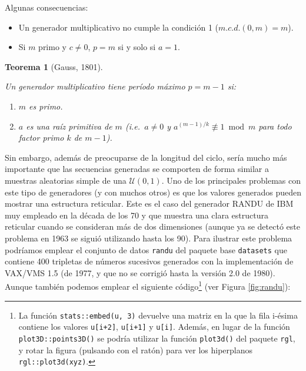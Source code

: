 \documentclass[
  10pt,
]{book}
\theoremstyle{break}
\newtheorem{theorem}{Teorema}[chapter]
\theoremstyle{nonumberplain}
\let\oldfootnote\footnote
\renewcommand\footnote[1]{\oldfootnote{\hspace{2mm}#1}}
\begin{document}
Algunas consecuencias:

\begin{itemize}
\item
  Un generador multiplicativo no cumple la condición 1 (\(m.c.d.(0, m) = m\)).
\item
  Si \(m\) primo y \(c \neq 0\), \(p = m\) si y solo si \(a = 1\).
\end{itemize}

\begin{theorem}[Gauss, 1801]
\protect\hypertarget{thm:gauss}{}\label{thm:gauss}

Un generador multiplicativo tiene período máximo \(p = m-1\) si:

\begin{enumerate}
\def\labelenumi{\arabic{enumi}.}
\item
  \(m\) es primo.
\item
  \(a\) es una raíz primitiva de \(m\) (i.e.~\(a \neq 0\) y \(a^{(m-1)/k} \not\equiv 1 \bmod m\)
  para todo factor primo \(k\) de \(m - 1\)).
\end{enumerate}

\end{theorem}

Sin embargo, además de preocuparse de la longitud del ciclo, sería mucho más importante que las secuencias generadas se comporten de forma similar a muestras aleatorias simple de una \(\mathcal{U}(0,1)\).
Uno de los principales problemas con este tipo de generadores (y con muchos otros) es que los valores generados pueden mostrar una estructura reticular.
Este es el caso del generador RANDU de IBM muy empleado en la década de los 70 y que muestra una clara estructura reticular cuando se consideran más de dos dimensiones (aunque ya se detectó este problema en 1963 se siguió utilizando hasta los 90).
Para ilustrar este problema podríamos emplear el conjunto de datos \texttt{randu} del paquete base \texttt{datasets} que contiene 400 tripletas de números sucesivos generados con la implementación de VAX/VMS 1.5 (de 1977, y que no se corrigió hasta la versión 2.0 de 1980).
Aunque también podemos emplear el siguiente código\footnote{La función \texttt{stats::embed(u,\ 3)} devuelve una matriz en la que la fila i-ésima contiene los valores \texttt{u{[}i+2{]}}, \texttt{u{[}i+1{]}} y \texttt{u{[}i{]}}. Además, en lugar de la función \texttt{plot3D::points3D()} se podría utilizar la función \texttt{plot3d()} del paquete \texttt{rgl}, y rotar la figura (pulsando con el ratón) para ver los hiperplanos \texttt{rgl::plot3d(xyz)}.} (ver Figura \ref{fig:randu}):
\end{document}
